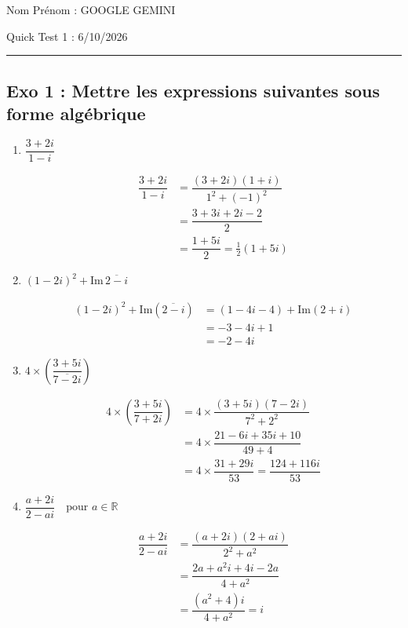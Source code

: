 \documentclass[13pt]{extarticle}
\author{}
\date{}
\begin{document}
\noindent
\large{Nom Prénom : GOOGLE GEMINI}
\begin{center}
\Large{Quick Test 1 :} 6/10/2026 \\
\end{center}
\begin{center}\rule{0.5\linewidth}{0.5pt}\end{center}

\subsection{Exo 1 : Mettre les expressions suivantes sous forme
algébrique }

\begin{enumerate}
\def\labelenumi{\arabic{enumi}.}
\item \(\dfrac{3+2i}{1-i}\)
\begin{framed}
\begin{align*}
\dfrac{3+2i}{1-i} &= \dfrac{(3+2i)(1+i)}{1^2 + (-1)^2} \\
&= \dfrac{3 + 3i + 2i - 2}{2} \\
&= \dfrac{1 + 5i}{2} = \frac{1}{2}(1 + 5i)
\end{align*}
\end{framed}

\item \((1-2i)^2 + \mathrm{Im}\, \overline{2-i}\)
\begin{framed}
\begin{align*}
(1-2i)^2 + \mathrm{Im}(\overline{2-i}) &= (1 - 4i - 4) + \mathrm{Im}(2+i) \\
&= -3 - 4i + 1 \\
&= -2 - 4i
\end{align*}
\end{framed}

\item \(4 \times \left( \dfrac{3 + 5i}{\overline{7-2i}} \right)\)
\begin{framed}
\begin{align*}
4 \times \left( \dfrac{3+5i}{7+2i} \right) &= 4 \times \dfrac{(3+5i)(7-2i)}{7^2 + 2^2} \\
&= 4 \times \dfrac{21 - 6i + 35i + 10}{49 + 4} \\
&= 4 \times \dfrac{31 + 29i}{53} = \dfrac{124 + 116i}{53}
\end{align*}
\end{framed}

\item \(\dfrac{a+2i}{2-ai} \quad \text{pour } a \in \mathbb{R}\)
\begin{framed}
\begin{align*}
\dfrac{a+2i}{2-ai} &= \dfrac{(a+2i)(2+ai)}{2^2 + a^2} \\
&= \dfrac{2a + a^2 i + 4i - 2a}{4 + a^2} \\
&= \dfrac{(a^2+4)i}{4 + a^2} = i
\end{align*}
\end{framed}
\end{enumerate}
\end{document}
